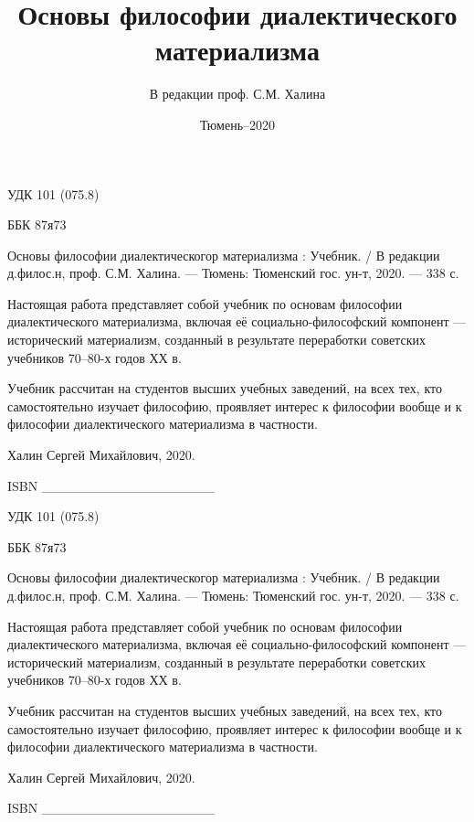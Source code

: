 \documentclass[a4paper,14pt,russian]{extreport}
\author{В редакции проф. С.М. Халина}
\date{Тюмень--2020}
\title{Основы философии диалектического материализма}
\begin{document}
\sloppy

\maketitle

\newpage

УДК 101 (075.8)

ББК 87я73

Основы философии диалектическогор материализма : Учебник. / В
редакции д.филос.н, проф. С.М. Халина. --- Тюмень: Тюменский гос. ун-т,
2020. --- 338 с.

Настоящая работа представляет собой учебник по основам философии
диалектического материализма, включая её социально-философский компонент
--- исторический материализм, созданный в результате переработки
советских учебников 70--80-х годов ХХ в.

Учебник рассчитан на студентов высших учебных заведений, на всех тех,
кто самостоятельно изучает философию, проявляет интерес к философии
вообще и к философии диалектического материализма в частности.

\textsuperscript{\textcopyright} Халин Сергей Михайлович, 2020.

ISBN \_\_\_\_\_\_\_\_\_\_\_\_\_\_\_\_\_\_

\newpage

\tableofcontents

\newpage


УДК 101 (075.8)

ББК 87я73

Основы философии диалектическогор материализма : Учебник. / В редакции д.филос.н, проф. С.М. Халина. --- Тюмень: Тюменский гос. ун-т, 2020. --- 338 с.

Настоящая работа представляет собой учебник по основам философии диалектического материализма, включая её социально-философский компонент --- исторический материализм, созданный в результате переработки советских учебников 70--80-х годов ХХ в.

Учебник рассчитан на студентов высших учебных заведений, на всех тех, кто самостоятельно изучает философию, проявляет интерес к философии вообще и к философии диалектического материализма в частности.

\textsuperscript{\textcopyright} Халин Сергей Михайлович, 2020.

ISBN \_\_\_\_\_\_\_\_\_\_\_\_\_\_\_\_\_\_

\newpage

\tableofcontents
\end{document}
